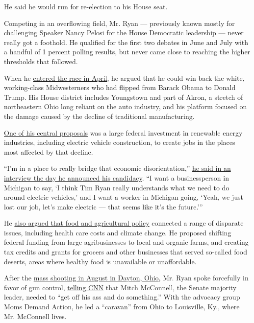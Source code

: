 He said he would run for re-election to his House seat.

Competing in an overflowing field, Mr. Ryan --- previously known mostly
for challenging Speaker Nancy Pelosi for the House Democratic leadership
--- never really got a foothold. He qualified for the first two debates
in June and July with a handful of 1 percent polling results, but never
came close to reaching the higher thresholds that followed.

When he
\href{https://www.nytimes.com/2019/04/04/us/politics/tim-ryan-2020.html}{entered
the race in April}, he argued that he could win back the white,
working-class Midwesterners who had flipped from Barack Obama to Donald
Trump. His House district includes Youngstown and part of Akron, a
stretch of northeastern Ohio long reliant on the auto industry, and his
platform focused on the damage caused by the decline of traditional
manufacturing.

\href{https://www.nytimes.com/2019/06/26/us/politics/tim-ryan-manufacturing-jobs.html}{One
of his central proposals} was a large federal investment in renewable
energy industries, including electric vehicle construction, to create
jobs in the places most affected by that decline.

``I'm in a place to really bridge that economic disorientation,''
\href{https://www.nytimes.com/2019/04/04/us/politics/tim-ryan-2020.html}{he
said in an interview the day he announced his candidacy}. ``I want a
businessperson in Michigan to say, `I think Tim Ryan really understands
what we need to do around electric vehicles,' and I want a worker in
Michigan going, `Yeah, we just lost our job, let's make electric ---
that seems like it's the future.'''

He
\href{https://www.nytimes.com/2019/07/30/us/politics/tim-ryan-farming-agriculture.html}{also
argued that food and agricultural policy} connected a range of disparate
issues, including health care costs and climate change. He proposed
shifting federal funding from large agribusinesses to local and organic
farms, and creating tax credits and grants for grocers and other
businesses that served so-called food deserts, areas where healthy food
is unavailable or unaffordable.

After the
\href{https://www.nytimes.com/2019/08/04/us/dayton-ohio-shooting.html}{mass
shooting in August in Dayton, Ohio}, Mr. Ryan spoke forcefully in favor
of gun control,
\href{https://www.cnn.com/2019/08/05/politics/tim-ryan-donald-trump-gun-reform-immigration-cnntv/index.html}{telling
CNN} that Mitch McConnell, the Senate majority leader, needed to ``get
off his ass and do something.'' With the advocacy group Moms Demand
Action, he led a ``caravan'' from Ohio to Louisville, Ky., where Mr.
McConnell lives.

